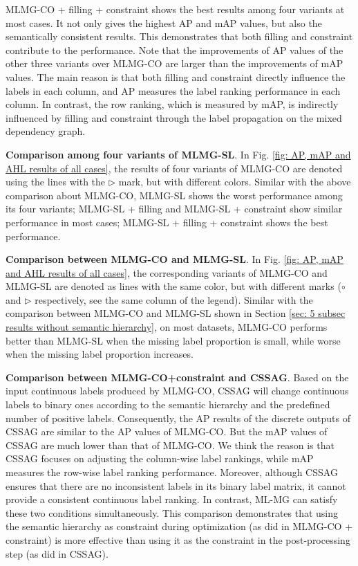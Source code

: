 \documentclass[twocolumn]{svjour3}          %
\begin{document}
MLMG-CO + filling + constraint shows the best results among four variants at most cases. It not only gives the highest AP and mAP values, but also the semantically consistent results. 
This demonstrates that both filling and constraint contribute to the performance. 
%
Note that the improvements of AP values of the other three variants over MLMG-CO are larger than the improvements of mAP values. 
The main reason is that both filling and constraint directly influence the labels in each column, and AP measures the label ranking performance in each column. In contrast, the row ranking, which is measured by mAP, is indirectly influenced by filling and constraint through the label propagation on the mixed dependency graph. 


\vspace{4pt}\noindent
\textbf{Comparison among four variants of MLMG-SL}. 
In Fig. \ref{fig: AP, mAP and AHL results of all cases}, the results of four variants of MLMG-CO are denoted using the lines with the 
$\triangleright$ mark, but with different colors. 
Similar with the above comparison about MLMG-CO, MLMG-SL shows the worst performance among its four variants; MLMG-SL + filling and MLMG-SL + constraint show similar performance in most cases; MLMG-SL + filling + constraint shows the best performance. 


\vspace{4pt}\noindent
\textbf{Comparison between MLMG-CO and MLMG-SL}. 
In Fig. \ref{fig: AP, mAP and AHL results of all cases}, the corresponding variants of MLMG-CO and MLMG-SL are denoted as lines with the same color, but with different marks ($\circ$ and $\triangleright$ respectively, see the same column of the legend). 
Similar with the comparison between MLMG-CO and MLMG-SL shown in Section \ref{sec: 5 subsec results without semantic hierarchy}, on most datasets, MLMG-CO performs better than MLMG-SL when the missing label proportion is small, while worse when the missing label proportion increases. 

\vspace{4pt}\noindent
\textbf{Comparison between MLMG-CO+constraint and CSSAG}. 
Based on the input continuous labels produced by MLMG-CO, CSSAG will change continuous labels to binary ones according to the semantic hierarchy and the predefined number of positive labels.
Consequently, the AP results of the discrete outputs of CSSAG are similar to the AP values of MLMG-CO. 
But the mAP values of CSSAG are much lower than that of MLMG-CO. We think the reason is that CSSAG focuses on adjusting the column-wise label rankings, while mAP measures the row-wise label ranking performance. 
Moreover, although CSSAG ensures that there are no inconsistent labels in its binary label matrix, it cannot provide a consistent continuous label ranking. In contrast, ML-MG can satisfy these two conditions simultaneously. This comparison demonstrates that using the semantic hierarchy as constraint during optimization (as did in MLMG-CO + constraint) is more effective than using it as the constraint in the post-processing step (as did in CSSAG). 
\end{document}
